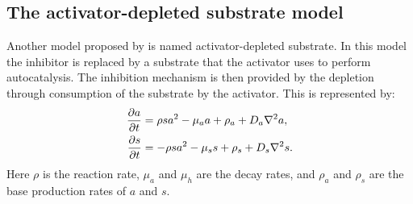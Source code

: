 \subsection{The activator-depleted substrate model}
Another model proposed by \citet{Meinhardt1982} is named activator-depleted substrate. In this model the inhibitor is replaced by a substrate that the activator uses to perform autocatalysis. The inhibition mechanism is then provided by the depletion through consumption of the substrate by the activator. This is represented by:
	\begin{equation}
	\begin{aligned} \label{eq:activatorSubstrateRD}
		\frac{\partial a}{\partial t} &= \rho sa^2 - \mu_a a + \rho_a + D_a \nabla^2 a,\\
		\frac{\partial s}{\partial t} &= -\rho sa^2 - \mu_s s + \rho_s + D_s \nabla^2 s.
	\end{aligned}
	\end{equation}
Here $\rho$ is the reaction rate, $\mu_a$ and $\mu_h$ are the decay rates, and $\rho_a$ and $\rho_s$ are the base production rates of $a$ and $s$.

